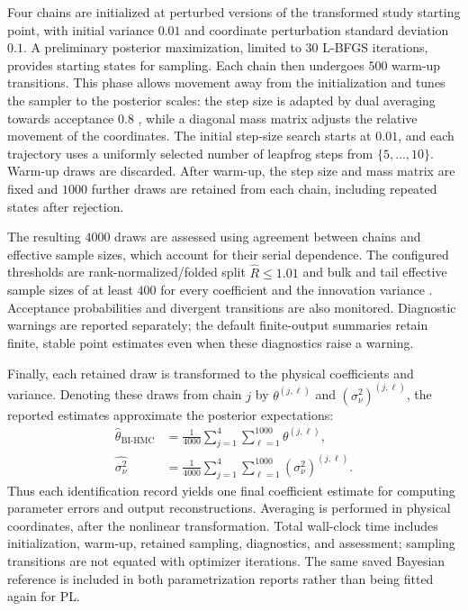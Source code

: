 \documentclass[11pt]{article}
\def\BIHMCfinishstandalone{%
    \end{document}}
\begin{document}
Four chains are initialized at perturbed versions of the transformed
study starting point, with initial variance $0.01$ and coordinate
perturbation standard deviation $0.1$. A preliminary posterior
maximization, limited to $30$ L-BFGS iterations, provides starting states
for sampling. Each chain then undergoes $500$ warm-up transitions.
This phase allows movement away from the initialization and tunes the
sampler to the posterior scales: the step size is adapted by dual
averaging towards acceptance $0.8$ \cite{HoffmanGelman2014}, while a
diagonal mass matrix adjusts the relative movement of the coordinates.
The initial step-size search starts at $0.01$, and each trajectory uses
a uniformly selected number of leapfrog steps from $\{5,\ldots,10\}$.
Warm-up draws are discarded. After warm-up, the step size and mass
matrix are fixed and $1000$ further draws are retained from each chain,
including repeated states after rejection.

The resulting $4000$ draws are assessed using agreement between chains
and effective sample sizes, which account for their serial dependence.
The configured thresholds are rank-normalized/folded split
$\widehat R\leq1.01$ and bulk and tail effective sample sizes of at
least $400$ for every coefficient and the innovation variance
\cite{VehtariEtAl2021}. Acceptance probabilities and divergent
transitions are also monitored. Diagnostic warnings are reported
separately; the default finite-output summaries retain finite, stable
point estimates even when these diagnostics raise a warning.

Finally, each retained draw is transformed to the physical coefficients
and variance. Denoting these draws from chain $j$ by
$\theta^{(j,\ell)}$ and $(\sigma_\nu^2)^{(j,\ell)}$, the reported
estimates approximate the posterior expectations:
\begin{equation}
\label{eq:bi_posterior_means}
 \begin{aligned}
 \hat\theta_{\mathrm{BI\text{-}HMC}}
 &=\frac{1}{4000}\sum_{j=1}^{4}\sum_{\ell=1}^{1000}
      \theta^{(j,\ell)},\\
 \widehat{\sigma_\nu^2}
 &=\frac{1}{4000}\sum_{j=1}^{4}\sum_{\ell=1}^{1000}
      (\sigma_\nu^2)^{(j,\ell)}.
 \end{aligned}
\end{equation}
Thus each identification record yields one final coefficient estimate
for computing parameter errors and output reconstructions. Averaging
is performed in physical coordinates, after the nonlinear transformation.
Total wall-clock time includes initialization, warm-up, retained
sampling, diagnostics, and assessment; sampling transitions are not
equated with optimizer iterations. The same saved Bayesian reference
is included in both parametrization reports rather than being fitted
again for PL.
\BIHMCfinishstandalone
\end{document}
